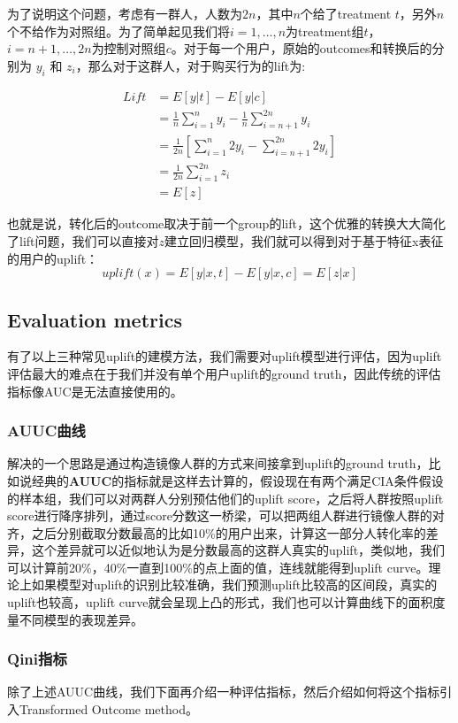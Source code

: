 \documentclass[12pt]{article}
\begin{document}
为了说明这个问题，考虑有一群人，人数为$2n$，其中$n$个给了treatment $t$，另外$n$个不给作为对照组。为了简单起见我们将$i =1 ,…, n$为treatment组$t$，$i =n+1 ,…, 2n$为控制对照组$c$。对于每一个用户，原始的outcomes和转换后的分别为 $y_i$ 和 $z_i$，那么对于这群人，对于购买行为的lift为:

\begin{align*}
Lift & = E[y|t] - E[y|c] \\
      & = \frac{1}{n}\sum_{i=1}^ny_i - \frac{1}{n}\sum_{i=n+1}^{2n}y_i \\
      & = \frac{1}{2n}[\sum_{i=1}^n2y_i - \sum_{i=n+1}^{2n}2y_i]  \\
      & = \frac{1}{2n}\sum_{i=1}^{2n}z_i \\
      & = E[z]
\end{align*}

也就是说，转化后的outcome取决于前一个group的lift，这个优雅的转换大大简化了lift问题，我们可以直接对$z$建立回归模型，我们就可以得到对于基于特征x表征的用户的uplift：
$$
uplift(x) = E[y|x,t] - E[y|x,c] = E[z|x]
$$

\subsection{Evaluation metrics}
有了以上三种常见uplift的建模方法，我们需要对uplift模型进行评估，因为uplift评估最大的难点在于我们并没有单个用户uplift的ground truth，因此传统的评估指标像AUC是无法直接使用的。

\subsubsection{AUUC曲线}
解决的一个思路是通过构造镜像人群的方式来间接拿到uplift的ground truth，比如说经典的\textbf{AUUC}的指标就是这样去计算的，假设现在有两个满足CIA条件假设的样本组，我们可以对两群人分别预估他们的uplift score，之后将人群按照uplift score进行降序排列，通过score分数这一桥梁，可以把两组人群进行镜像人群的对齐，之后分别截取分数最高的比如10\%的用户出来，计算这一部分人转化率的差异，这个差异就可以近似地认为是分数最高的这群人真实的uplift，类似地，我们可以计算前20\%，40\%一直到100\%的点上面的值，连线就能得到uplift curve。理论上如果模型对uplift的识别比较准确，我们预测uplift比较高的区间段，真实的uplift也较高，uplift curve就会呈现上凸的形式，我们也可以计算曲线下的面积度量不同模型的表现差异。

\subsubsection{Qini指标}
除了上述AUUC曲线，我们下面再介绍一种评估指标，然后介绍如何将这个指标引入Transformed Outcome method。
\end{document}
